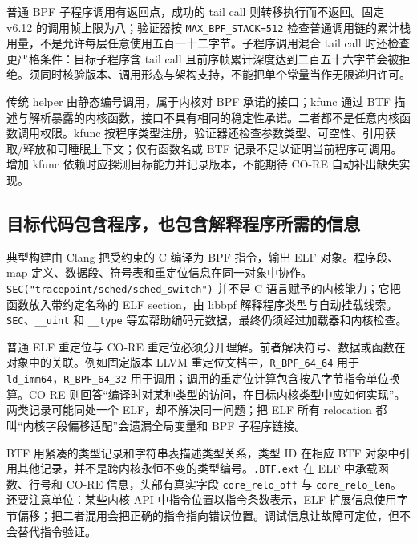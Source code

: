 \documentclass[UTF8,fontset=fandol,openany,11pt]{ctexbook}
\begin{document}
普通 BPF 子程序调用有返回点，成功的 tail call 则转移执行而不返回。固定 v6.12 的调用帧上限为八；验证器按 \texttt{MAX\_\allowbreak{}BPF\_\allowbreak{}STACK=512} 检查普通调用链的累计栈用量，不是允许每层任意使用五百一十二字节。子程序调用混合 tail call 时还检查更严格条件：目标子程序含 tail call 且前序帧累计深度达到二百五十六字节会被拒绝。须同时核验版本、调用形态与架构支持，不能把单个常量当作无限递归许可。\cite{eb-isa}\cite{eb-verifier-code}\cite{eb-verifier-state}\cite{eb-design-qa}


传统 helper 由静态编号调用，属于内核对 BPF 承诺的接口；kfunc 通过 BTF 描述与解析暴露的内核函数，接口不具有相同的稳定性承诺。二者都不是任意内核函数调用权限。kfunc 按程序类型注册，验证器还检查参数类型、可空性、引用获取/释放和可睡眠上下文；仅有函数名或 BTF 记录不足以证明当前程序可调用。增加 kfunc 依赖时应探测目标能力并记录版本，不能期待 CO-RE 自动补出缺失实现。\cite{eb-design-qa}\cite{eb-kfuncs}\cite{eb-isa}


\subsection{目标代码包含程序，也包含解释程序所需的信息}

典型构建由 Clang 把受约束的 C 编译为 BPF 指令，输出 ELF 对象。程序段、map 定义、数据段、符号表和重定位信息在同一对象中协作。\texttt{SEC("tracepoint/\allowbreak{}sched/\allowbreak{}sched\_\allowbreak{}switch")} 并不是 C 语言赋予的内核能力；它把函数放入带约定名称的 ELF section，由 libbpf 解释程序类型与自动挂载线索。\texttt{SEC}、\texttt{\_\allowbreak{}\_\allowbreak{}uint} 和 \texttt{\_\allowbreak{}\_\allowbreak{}type} 等宏帮助编码元数据，最终仍须经过加载器和内核检查。\cite{eb-helpers}\cite{eb-libbpf-overview}


普通 ELF 重定位与 CO-RE 重定位必须分开理解。前者解决符号、数据或函数在对象中的关联。例如固定版本 LLVM 重定位文档中，\texttt{R\_\allowbreak{}BPF\_\allowbreak{}64\_\allowbreak{}64} 用于 \texttt{ld\_\allowbreak{}imm64}，\texttt{R\_\allowbreak{}BPF\_\allowbreak{}64\_\allowbreak{}32} 用于调用；调用的重定位计算包含按八字节指令单位换算。CO-RE 则回答“编译时对某种类型的访问，在目标内核类型中应如何实现”。两类记录可能同处一个 ELF，却不解决同一问题；把 ELF 所有 relocation 都叫“内核字段偏移适配”会遗漏全局变量和 BPF 子程序链接。\cite{eb-llvm-reloc}\cite{eb-core-relo}


BTF 用紧凑的类型记录和字符串表描述类型关系，类型 ID 在相应 BTF 对象中引用其他记录，并不是跨内核永恒不变的类型编号。\texttt{.\allowbreak{}BTF.\allowbreak{}ext} 在 ELF 中承载函数、行号和 CO-RE 信息，头部有真实字段 \texttt{core\_\allowbreak{}relo\_\allowbreak{}off} 与 \texttt{core\_\allowbreak{}relo\_\allowbreak{}len}。还要注意单位：某些内核 API 中指令位置以指令条数表示，ELF 扩展信息使用字节偏移；把二者混用会把正确的指令指向错误位置。调试信息让故障可定位，但不会替代指令验证。\cite{eb-btf}
\end{document}
